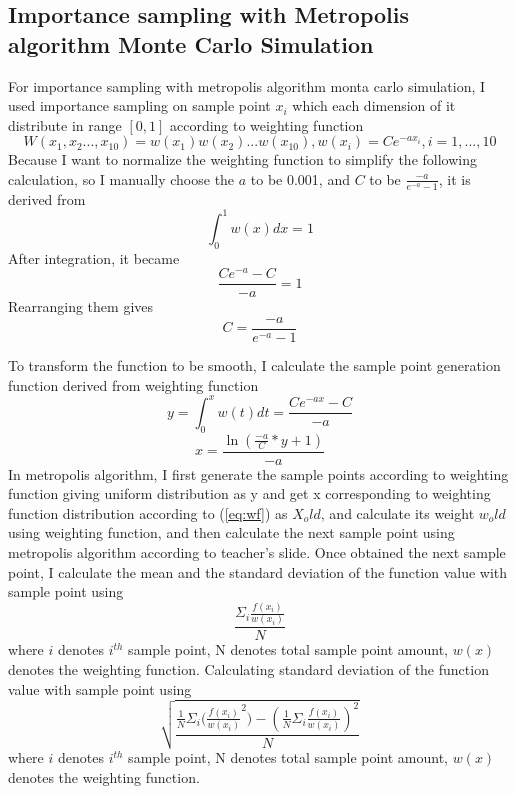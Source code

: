 \documentclass{article}
\begin{document}
	\subsection{Importance sampling with Metropolis algorithm Monte Carlo Simulation}
	For importance sampling with metropolis algorithm monta carlo simulation, I used importance sampling on sample point $x_i$ which each dimension of it distribute in range $[0, 1]$ according to weighting function 
	\begin{equation}
		W(x_1, x_2..., x_10)=w(x_1)w(x_2)...w(x_10), w(x_i)=Ce^{-ax_i}, i=1, ..., 10
	\end{equation}
	Because I want to normalize the weighting function to simplify the following calculation, so I manually choose the $a$ to be 0.001, and $C$ to be
	$\frac{-a}{e^{-a}-1}$, it is derived from
	\begin{equation}
		\int_{0}^{1}w(x)dx=1
	\end{equation}
	After integration, it became
	\begin{equation}
		\frac{Ce^{-a}-C}{-a}=1
	\end{equation}
	Rearranging them gives
	\begin{equation}
		C=\frac{-a}{e^{-a}-1}
	\end{equation}

	To transform the function to be smooth, I calculate the sample point generation function derived from weighting function
	\begin{equation}
		y=\int_0^x w(t)dt=\frac{Ce^{-ax}-C}{-a}
	\end{equation}
	\begin{equation}
		\label{eq:wf}
		x=\frac{\ln(\frac{-a}{C}*y+1)}{-a}
	\end{equation}
	In metropolis algorithm, I first generate the sample points according to weighting function giving uniform distribution as y and get x corresponding to weighting function distribution according to (\ref{eq:wf}) as $X_old$, and calculate its weight $w_old$ using weighting function, and then calculate the next sample point using metropolis algorithm according to teacher's slide. Once obtained the next sample point, I calculate the mean and the standard deviation of the function value with sample point  using 
	\begin{equation}
		\frac{\Sigma_i{\frac{f(x_i)}{w(x_i)}}}{N}
	\end{equation}
	where $i$ denotes $i^{th}$ sample point, N denotes total sample point amount, $w(x)$ denotes the weighting function.
	Calculating standard deviation of the function value with sample point using 
	\begin{equation}
		\sqrt{\frac{\frac{1}{N}\Sigma_i({\frac{f(x_i)}{w(x_i)}^2)}-(\frac{1}{N}\Sigma_i{\frac{f(x_i)}{w(x_i)}})^2}{N}}
	\end{equation}
	where $i$ denotes $i^{th}$ sample point, N denotes total sample point amount, $w(x)$ denotes the weighting function.
	
\end{document}
